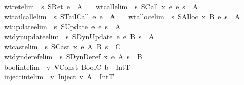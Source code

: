 \begin{isabellebody}
\ \ wtret{\isacharbrackleft}elim{\isacharbang}{\isacharbrackright}{\isacharcolon}\ {\isachardoublequoteopen}{\isasymGamma}\ {\isasymturnstile}\isactrlisub s\ SRet\ e\ {\isacharcolon}\ A{\isachardoublequoteclose}\ \isanewline
\ \ wtcall{\isacharbrackleft}elim{\isacharbang}{\isacharbrackright}{\isacharcolon}\ {\isachardoublequoteopen}{\isasymGamma}\ {\isasymturnstile}\isactrlisub s\ SCall\ x\ e{}\ e{}\ s\ {\isacharcolon}\ A{\isachardoublequoteclose}\ \isanewline
\ \ wttailcall{\isacharbrackleft}elim{\isacharbang}{\isacharbrackright}{\isacharcolon}\ {\isachardoublequoteopen}{\isasymGamma}\ {\isasymturnstile}\isactrlisub s\ STailCall\ e{}\ e{}\ {\isacharcolon}\ A{\isachardoublequoteclose}\ \isanewline
\ \ wtalloc{\isacharbrackleft}elim{\isacharbang}{\isacharbrackright}{\isacharcolon}\ {\isachardoublequoteopen}{\isasymGamma}\ {\isasymturnstile}\isactrlisub s\ SAlloc\ x\ B\ e\ s\ {\isacharcolon}\ A{\isachardoublequoteclose}\ \isanewline
\ \ wtupdate{\isacharbrackleft}elim{\isacharbang}{\isacharbrackright}{\isacharcolon}\ {\isachardoublequoteopen}{\isasymGamma}\ {\isasymturnstile}\isactrlisub s\ SUpdate\ e{}\ e{}\ s\ {\isacharcolon}\ A{\isachardoublequoteclose}\ \isanewline
\ \ wtdynupdate{\isacharbrackleft}elim{\isacharbang}{\isacharbrackright}{\isacharcolon}\ {\isachardoublequoteopen}{\isasymGamma}\ {\isasymturnstile}\isactrlisub s\ SDynUpdate\ e{}\ e{}\ B\ s\ {\isacharcolon}\ A{\isachardoublequoteclose}\ \ \isanewline
\ \ wtcast{\isacharbrackleft}elim{\isacharbang}{\isacharbrackright}{\isacharcolon}\ {\isachardoublequoteopen}{\isasymGamma}\ {\isasymturnstile}\isactrlisub s\ SCast\ x\ e\ A\ B\ s\ {\isacharcolon}\ C{\isachardoublequoteclose}\ \isanewline
\ \ wtdynderef{\isacharbrackleft}elim{\isacharbang}{\isacharbrackright}{\isacharcolon}\ {\isachardoublequoteopen}{\isasymGamma}\ {\isasymturnstile}\isactrlisub s\ SDynDeref\ x\ e\ A\ s\ {\isacharcolon}\ B{\isachardoublequoteclose}\isanewline
\isanewline
{}\isamarkupfalse \isanewline
\ \ bool{\isacharunderscore}int{\isacharbrackleft}elim{\isacharbang}{\isacharbrackright}{\isacharcolon}\ {\isachardoublequoteopen}{\isasymSigma}\ {\isasymturnstile}v\ {\isacharparenleft}VConst\ {\isacharparenleft}BoolC\ b{\isacharparenright}{\isacharparenright}\ {\isacharcolon}\ IntT{\isachardoublequoteclose}\ \isanewline
\ \ inject{\isacharunderscore}int{\isacharbrackleft}elim{\isacharbang}{\isacharbrackright}{\isacharcolon}\ {\isachardoublequoteopen}{\isasymSigma}\ {\isasymturnstile}v\ {\isacharparenleft}Inject\ v\ A{\isacharparenright}\ {\isacharcolon}\ IntT{\isachardoublequoteclose}\ \isanewline

\end{isabellebody}
